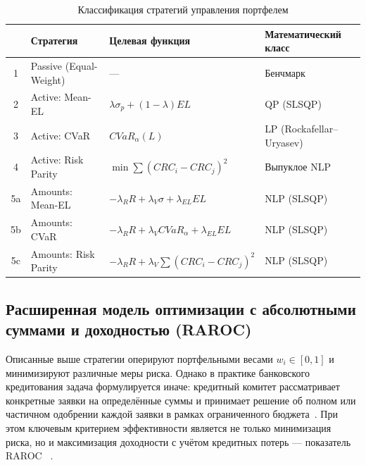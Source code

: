 \documentclass[]{article}
\begin{document}
	\begin{table}[h!]
		\centering
		\caption{Классификация стратегий управления портфелем}
		\label{tab:strategies}
		\footnotesize
		\setlength{\tabcolsep}{4pt}
		\renewcommand{\arraystretch}{1.15}
		\begin{tabularx}{\textwidth}{c X X X}
			\toprule
			\textbf{\textnumero} & \textbf{Стратегия} & \textbf{Целевая функция} & \textbf{Математический класс} \\
			\midrule
			1  & Passive (Equal-Weight) & ---                                                                & Бенчмарк \\
			2  & Active: Mean-EL        & $\lambda \sigma_p + (1-\lambda) EL$                                & QP (SLSQP) \\
			3  & Active: CVaR           & $CVaR_\alpha(L)$                                                   & LP (Rockafellar--Uryasev) \\
			4  & Active: Risk Parity    & $\min \sum (CRC_i - CRC_j)^2$                                      & Выпуклое NLP \\
			5a & Amounts: Mean-EL       & $-\lambda_R R + \lambda_V \sigma + \lambda_{EL} EL$                & NLP (SLSQP) \\
			5b & Amounts: CVaR          & $-\lambda_R R + \lambda_V CVaR_\alpha + \lambda_{EL} EL$           & NLP (SLSQP) \\
			5c & Amounts: Risk Parity   & $-\lambda_R R + \lambda_V \sum(CRC_i - CRC_j)^2$                   & NLP (SLSQP) \\
			\bottomrule
		\end{tabularx}
	\end{table}

	\subsection{Расширенная модель оптимизации с абсолютными суммами и доходностью (RAROC)}
	\label{raroc_model}

	Описанные выше стратегии оперируют портфельными весами $w_i \in [0, 1]$ и минимизируют
	различные меры риска. Однако в практике банковского кредитования задача формулируется иначе:
	кредитный комитет рассматривает конкретные заявки на определённые суммы и принимает решение
	об полном или частичном одобрении каждой заявки в рамках ограниченного бюджета~\cite{zaik1996,matten2000}.
	При этом ключевым критерием эффективности является не только минимизация риска, но и максимизация
	доходности с учётом кредитных потерь --- показатель RAROC ~\cite{crouhy1999}.
\end{document}
